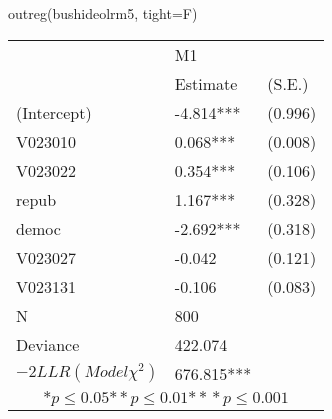 \begin{Schunk}
\begin{Sinput}
 outreg(bushideolrm5, tight=F)
\end{Sinput}
\begin{tabular}{*{3}{l}}
\hline
     & \multicolumn{2}{l}{ M1}\tabularnewline
      & Estimate  & (S.E.) \tabularnewline
 \hline
 \hline
  (Intercept)    &-4.814*** &   (0.996) \tabularnewline
  V023010    &0.068*** &   (0.008) \tabularnewline
  V023022    &0.354*** &   (0.106) \tabularnewline
  repub    &1.167*** &   (0.328) \tabularnewline
  democ    &-2.692*** &   (0.318) \tabularnewline
  V023027    &-0.042 &   (0.121) \tabularnewline
  V023131    &-0.106 &   (0.083) \tabularnewline
 \hline
 N & 800 &  \tabularnewline
    Deviance         &422.074         & \tabularnewline
 $-2LLR (Model \chi^2)$  &   676.815*** &   \tabularnewline
 \hline
\hline
 
 \multicolumn{3}{c}{${*  p}\le 0.05$${*\!\!*  p}\le 0.01$${*\!\!*\!\!*  p}\le 0.001$}\tabularnewline
 \end{tabular}\end{Schunk}

